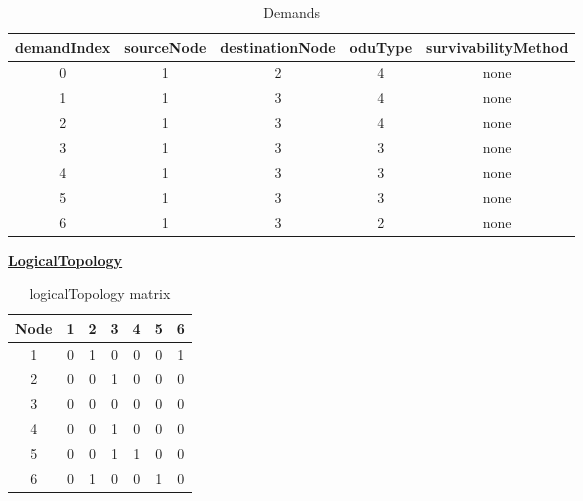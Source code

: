 \begin{table}[H]
	\centering
	\begin{tabular}{| c | c | c | c | c |}
		\hline
		\textbf{demandIndex} & \textbf{sourceNode} & \textbf{destinationNode} & \textbf{oduType} & \textbf{survivabilityMethod}\\ \hline
		0                    & 1                   & 2                        & 4                & none						   \\ \hline
		1                    & 1                   & 3                        & 4                & none                        \\ \hline
		2                    & 1                   & 3                        & 4                & none                        \\ \hline
		3                    & 1                   & 3                        & 3                & none                        \\ \hline
		4                    & 1                   & 3                        & 3                & none                        \\ \hline
		5                    & 1                   & 3                        & 3                & none                        \\ \hline
		6                    & 1                   & 3                        & 2                & none                        \\ \hline
	\end{tabular}
	\caption{Demands}
	\label{demands}
\end{table}

\underline{\textbf{LogicalTopology}}

\begin{table}[H]
	\centering
	\begin{tabular}{| c | c | c | c | c | c | c |}
		\hline
		\textbf{Node} & 1 & 2 & 3 & 4 & 5 & 6 \\ \hline
		1             & 0 & 1 & 0 & 0 & 0 & 1 \\ \hline
		2             & 0 & 0 & 1 & 0 & 0 & 0 \\ \hline
		3             & 0 & 0 & 0 & 0 & 0 & 0 \\ \hline
		4			  & 0 & 0 & 1 & 0 & 0 & 0 \\ \hline	
		5    	      & 0 & 0 & 1 & 1 & 0 & 0 \\ \hline
		6			  & 0 & 1 & 0 & 0 & 1 & 0 \\ \hline
	\end{tabular}
	\caption{logicalTopology matrix}
	\label{logical_matrix}
\end{table}

